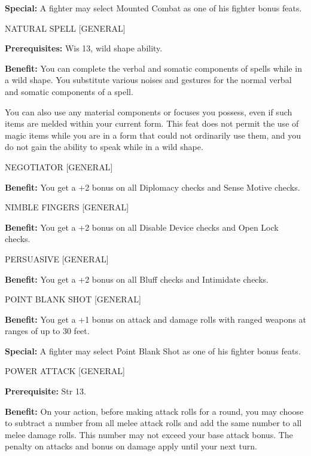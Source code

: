 \documentclass{article}
\begin{document}
\textbf{Special:} A fighter may select Mounted Combat as one of his fighter bonus 
feats.

\vspace{12pt}
NATURAL SPELL [GENERAL]

\textbf{Prerequisites: }Wis 13, wild shape ability.

\textbf{Benefit:} You can complete the verbal and somatic components of spells 
while in a wild shape. You substitute various noises and gestures for the normal 
verbal and somatic components of a spell.

You can also use any material components or focuses you possess, even if such items 
are melded within your current form. This feat does not permit the use of magic 
items while you are in a form that could not ordinarily use them, and you do not 
gain the ability to speak while in a wild shape.

\vspace{12pt}
NEGOTIATOR [GENERAL]

\textbf{Benefit:} You get a +2 bonus on all Diplomacy checks and Sense Motive checks.

\vspace{12pt}
NIMBLE FINGERS [GENERAL]

\textbf{Benefit:} You get a +2 bonus on all Disable Device checks and Open Lock 
checks.

\vspace{12pt}
PERSUASIVE [GENERAL]

\textbf{Benefit:} You get a +2 bonus on all Bluff checks and Intimidate checks.

\vspace{12pt}
POINT BLANK SHOT [GENERAL]

\textbf{Benefit:} You get a +1 bonus on attack and damage rolls with ranged weapons 
at ranges of up to 30 feet.

\textbf{Special:} A fighter may select Point Blank Shot as one of his fighter bonus 
feats.

\vspace{12pt}
POWER ATTACK [GENERAL]

\textbf{Prerequisite:} Str 13.

\textbf{Benefit:} On your action, before making attack rolls for a round, you may 
choose to subtract a number from all melee attack rolls and add the same number 
to all melee damage rolls. This number may not exceed your base attack bonus. The 
penalty on attacks and bonus on damage apply until your next turn.
\end{document}
